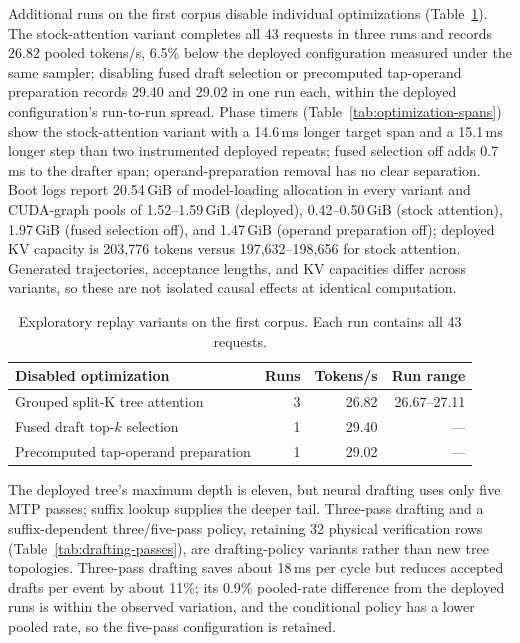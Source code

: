 Additional runs on the first corpus disable individual \sys{} optimizations (Table~\ref{tab:replay-variants}). The stock-attention variant completes all 43 requests in three runs and records 26.82 pooled tokens/s, 6.5\% below the deployed configuration measured under the same sampler; disabling fused draft selection or precomputed tap-operand preparation records 29.40 and 29.02 in one run each, within the deployed configuration's run-to-run spread. Phase timers (Table~\ref{tab:optimization-spans}) show the stock-attention variant with a 14.6\,ms longer target span and a 15.1\,ms longer step than two instrumented deployed repeats; fused selection off adds 0.7\,ms to the drafter span; operand-preparation removal has no clear separation. Boot logs report 20.54\,GiB of model-loading allocation in every variant and CUDA-graph pools of 1.52--1.59\,GiB (deployed), 0.42--0.50\,GiB (stock attention), 1.97\,GiB (fused selection off), and 1.47\,GiB (operand preparation off); deployed KV capacity is 203,776 tokens versus 197,632--198,656 for stock attention. Generated trajectories, acceptance lengths, and KV capacities differ across variants, so these are not isolated causal effects at identical computation.

\begin{table}[h]
\caption{Exploratory replay variants on the first corpus. Each run contains all 43 requests.}
\label{tab:replay-variants}
\centering\small
\setlength{\tabcolsep}{3pt}
\begin{tabular}{@{}lrrr@{}}
\toprule
Disabled optimization & Runs & Tokens/s & Run range \\
\midrule
Grouped split-K tree attention & 3 & 26.82 & 26.67--27.11 \\
Fused draft top-$k$ selection & 1 & 29.40 & --- \\
Precomputed tap-operand preparation & 1 & 29.02 & --- \\
\bottomrule
\end{tabular}
\end{table}



The deployed tree's maximum depth is eleven, but neural drafting uses only five MTP passes; suffix lookup supplies the deeper tail. Three-pass drafting and a suffix-dependent three/five-pass policy, retaining 32 physical verification rows (Table~\ref{tab:drafting-passes}), are drafting-policy variants rather than new tree topologies. Three-pass drafting saves about 18\,ms per cycle but reduces accepted drafts per event by about 11\%; its 0.9\% pooled-rate difference from the deployed runs is within the observed variation, and the conditional policy has a lower pooled rate, so the five-pass configuration is retained.

